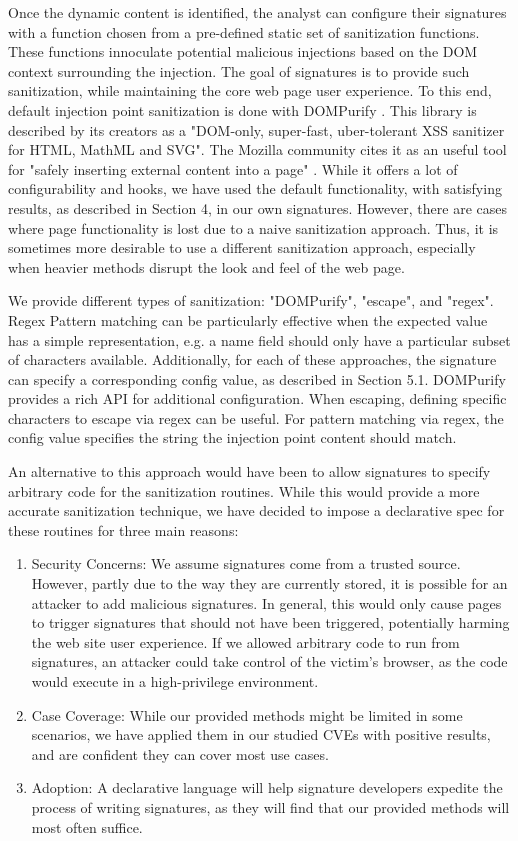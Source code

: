  Once the dynamic content is identified, the analyst can configure their signatures with a function chosen from a pre-defined static set of sanitization functions. These functions innoculate potential malicious injections based on the DOM context surrounding the injection. The goal of signatures is to provide such sanitization, while maintaining the core web page user experience. To this end, default injection point sanitization is done with DOMPurify \cite{10.1007/978-3-319-66399-9_7}. This library is described by its creators as a "DOM-only, super-fast, uber-tolerant XSS sanitizer for HTML, MathML and SVG". The Mozilla community cites it as an useful tool for "safely inserting external content into a page" \cite{safecontent}. While it offers a lot of configurability and hooks, we have used the default functionality, with satisfying results, as described in Section 4, in our own signatures. However, there are cases where page functionality is lost due to a naive sanitization approach. Thus, it is sometimes more desirable to use a different sanitization approach, especially when heavier methods disrupt the look and feel of the web page.
 
  We provide different types of sanitization: "DOMPurify", "escape", and "regex". Regex Pattern matching can be particularly effective when the expected value has a simple representation, e.g. a name field should only have a particular subset of characters available. Additionally, for each of these approaches, the signature can specify a corresponding config value, as described in Section 5.1. DOMPurify provides a rich API for additional configuration. When escaping, defining specific characters to escape via regex can be useful. For pattern matching via regex, the config value specifies the string the injection point content should match.
 
 An alternative to this approach would have been to allow signatures to specify arbitrary code for the sanitization routines. While this would provide a more accurate sanitization technique, we have decided to impose a declarative spec for these routines for three main reasons:
\begin{enumerate} 
	\item Security Concerns: We assume signatures come from a trusted source. However, partly due to the way they are currently stored, it is possible for an attacker to add malicious signatures. In general, this would only cause pages to trigger signatures that should not have been triggered, potentially harming the web site user experience. If we allowed arbitrary code to run from signatures, an attacker could take control of the victim's browser, as the code would execute in a high-privilege environment.
	\item Case Coverage: While our provided methods might be limited in some scenarios, we have applied them in our studied CVEs with positive results, and are confident they can cover most use cases.
	\item Adoption: A declarative language will help signature developers expedite the process of writing signatures, as they will find that our provided methods will most often suffice.
\end{enumerate}
 
